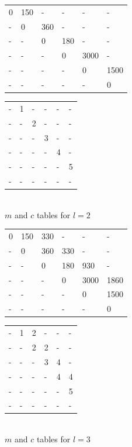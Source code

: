 \documentclass[11pt]{article}
\begin{document}
\begin{sol}
{%
	\centering
	\begin{tabular}{|l|l|l|l|l|l|}
		 \hline
        0 & 150 & - & - & - & - \\ 
        - & 0 & 360 & - & - & - \\ 
        - & - & 0 & 180 & - & - \\ 
        - & - & - & 0 & 3000 & -\\ 
        - & - & - & - & 0 & 1500  \\ 
        - & - & - & - & - & 0 \\
        \hline
	\end{tabular}
	\hspace{20mm}
	\begin{tabular}{|l|l|l|l|l|l|}
		 \hline
        - & 1 & - & - & - & - \\ 
        - & - & 2 & - & - & - \\ 
        - & - & - & 3 & - & - \\ 
        - & - & - & - & 4 & - \\ 
        - & - & - & - & - & 5 \\ 
        - & - & - & - & - & - \\
        \hline
	\end{tabular}\\ 
\vspace{0.5cm}
$m$ and $c$ tables for $l = 2$\\ 
\vspace{0.5cm}


	\centering
	\begin{tabular}{|l|l|l|l|l|l|}
		 \hline
        0 & 150 & 330 & - & - & - \\ 
        - & 0 & 360 &330 & - & - \\ 
        - & - & 0 & 180 & 930 & - \\ 
        - & - & - & 0 & 3000 & 1860\\ 
        - & - & - & - & 0 & 1500  \\ 
        - & - & - & - & - & 0 \\
        \hline
	\end{tabular}
	\hspace{20mm}
	\begin{tabular}{|l|l|l|l|l|l|}
		 \hline
        - & 1 & 2 & - & - & - \\ 
        - & - & 2 & 2 & - & - \\ 
        - & - & - & 3 & 4 & - \\ 
        - & - & - & - & 4 & 4 \\ 
        - & - & - & - & - & 5 \\ 
        - & - & - & - & - & - \\
        \hline
	\end{tabular}\\ 
\vspace{0.5cm}
$m$ and $c$ tables for $l = 3$\\ 
\vspace{0.5cm}

}
\end{sol}
\end{document}
